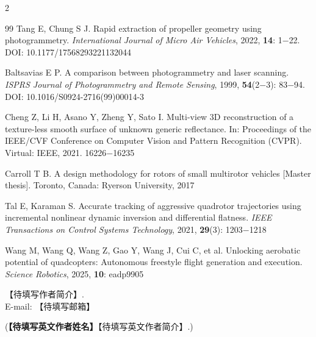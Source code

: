 \documentclass{aas}
\begin{document}
\begin{multicols}{2}
\begin{thebibliography}{99}
 Tang E, Chung S J. Rapid extraction of propeller geometry using photogrammetry. {\sl International Journal of Micro Air Vehicles}, 2022, {\bf 14}: 1$-$22. DOI: 10.1177/17568293221132044

 Baltsavias E P. A comparison between photogrammetry and laser scanning. {\sl ISPRS Journal of Photogrammetry and Remote Sensing}, 1999, {\bf 54}(2$-$3): 83$-$94. DOI: 10.1016/S0924-2716(99)00014-3

 Cheng Z, Li H, Asano Y, Zheng Y, Sato I. Multi-view 3D reconstruction of a texture-less smooth surface of unknown generic reflectance. In: Proceedings of the IEEE/CVF Conference on Computer Vision and Pattern Recognition (CVPR). Virtual: IEEE, 2021. 16226$-$16235

 Carroll T B. A design methodology for rotors of small multirotor vehicles [Master thesis]. Toronto, Canada: Ryerson University, 2017

 Tal E, Karaman S. Accurate tracking of aggressive quadrotor trajectories using incremental nonlinear dynamic inversion and differential flatness. {\sl IEEE Transactions on Control Systems Technology}, 2021, {\bf 29}(3): 1203$-$1218

 Wang M, Wang Q, Wang Z, Gao Y, Wang J, Cui C, et al. Unlocking aerobatic potential of quadcopters: Autonomous freestyle flight generation and execution. {\sl Science Robotics}, 2025, {\bf 10}: eadp9905

\end{thebibliography}

\begin{biographynophoto}
\quad 【待填写作者简介】.\\E-mail: 【待填写邮箱】

\noindent({\bf 【待填写英文作者姓名】}\quad 【待填写英文作者简介】.)
\end{biographynophoto}

\end{multicols}
\end{document}
